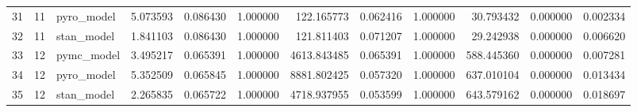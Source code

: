 \begin{tabular}{lrlrrrrrrrrr}
31 & 11 & pyro_model & 5.073593 & 0.086430 & 1.000000 & 122.165773 & 0.062416 & 1.000000 & 30.793432 & 0.000000 & 0.002334 \\
32 & 11 & stan_model & 1.841103 & 0.086430 & 1.000000 & 121.811403 & 0.071207 & 1.000000 & 29.242938 & 0.000000 & 0.006620 \\
33 & 12 & pymc_model & 3.495217 & 0.065391 & 1.000000 & 4613.843485 & 0.065391 & 1.000000 & 588.445360 & 0.000000 & 0.007281 \\
34 & 12 & pyro_model & 5.352509 & 0.065845 & 1.000000 & 8881.802425 & 0.057320 & 1.000000 & 637.010104 & 0.000000 & 0.013434 \\
35 & 12 & stan_model & 2.265835 & 0.065722 & 1.000000 & 4718.937955 & 0.053599 & 1.000000 & 643.579162 & 0.000000 & 0.018697 \\
\bottomrule
\end{tabular}
